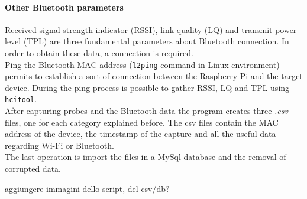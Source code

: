 \paragraph{Other Bluetooth parameters}
Received signal strength indicator (RSSI), link quality (LQ) and transmit power level (TPL) are three fundamental parameters about Bluetooth connection. In order to obtain these data, a connection is required.\\
Ping the Bluetooth MAC address (\texttt{l2ping} command in Linux environment) permits to establish a sort of connection between the Raspberry Pi and the target device. During the ping process is possible to gather RSSI, LQ and TPL using \texttt{hcitool}.\\
\linebreak
After capturing probes and the Bluetooth data the program creates three \textit{.csv} files, one for each category explained before. The csv files contain the MAC address of the device, the timestamp of the capture and all the useful data regarding Wi-Fi or Bluetooth.\\
The last operation is import the files in a MySql database and the removal of corrupted data.

aggiungere immagini dello script, del csv/db?